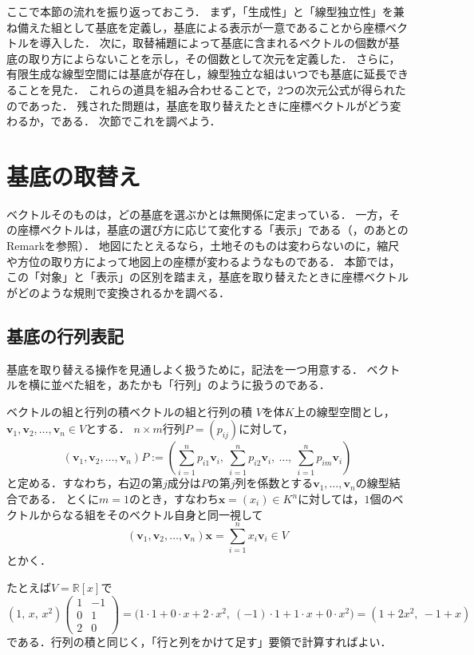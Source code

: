 ここで本節の流れを振り返っておこう．
まず，「生成性」と「線型独立性」を兼ね備えた組として基底を定義し，基底による表示が一意であることから座標ベクトルを導入した．
次に，取替補題によって基底に含まれるベクトルの個数が基底の取り方によらないことを示し，その個数として次元を定義した．
さらに，有限生成な線型空間には基底が存在し，線型独立な組はいつでも基底に延長できることを見た．
これらの道具を組み合わせることで，$2$つの次元公式が得られたのであった．
残された問題は，基底を取り替えたときに座標ベクトルがどう変わるか，である．
次節でこれを調べよう．

\section{基底の取替え}

ベクトルそのものは，どの基底を選ぶかとは無関係に定まっている．
一方，その座標ベクトルは，基底の選び方に応じて変化する「表示」である（，のあとのRemarkを参照）．
地図にたとえるなら，土地そのものは変わらないのに，縮尺や方位の取り方によって地図上の座標が変わるようなものである．
本節では，この「対象」と「表示」の区別を踏まえ，基底を取り替えたときに座標ベクトルがどのような規則で変換されるかを調べる．

\subsection{基底の行列表記}

基底を取り替える操作を見通しよく扱うために，記法を一つ用意する．
ベクトルを横に並べた組を，あたかも「行列」のように扱うのである．

\begin{definition}{ベクトルの組と行列の積}{ベクトルの組と行列の積}
  $V$を体$K$上の線型空間とし，$\bm{v}_1, \bm{v}_2, \dots, \bm{v}_n \in V$とする．
  $n \times m$行列$P = (p_{ij})$に対して，
  \[
    (\bm{v}_1, \bm{v}_2, \dots, \bm{v}_n) P
    :=
    \left( \sum_{i=1}^{n} p_{i1} \bm{v}_i,~ \sum_{i=1}^{n} p_{i2} \bm{v}_i,~ \dots,~ \sum_{i=1}^{n} p_{im} \bm{v}_i \right)
  \]
  と定める．すなわち，右辺の第$j$成分は$P$の第$j$列を係数とする$\bm{v}_1, \dots, \bm{v}_n$の線型結合である．
  とくに$m=1$のとき，すなわち$\bm{x} = (x_i) \in K^n$に対しては，$1$個のベクトルからなる組をそのベクトル自身と同一視して
  \[
    (\bm{v}_1, \bm{v}_2, \dots, \bm{v}_n) \bm{x}
    = \sum_{i=1}^{n} x_i \bm{v}_i \in V
  \]
  とかく．
\end{definition}

たとえば$V=\mathbb{R}[x]$で
\[
  (1,\,x,\,x^2)\begin{pmatrix} 1 & -1 \\ 0 & 1 \\ 2 & 0 \end{pmatrix}
  =\bigl(1\cdot1+0\cdot x+2\cdot x^2,~ (-1)\cdot1+1\cdot x+0\cdot x^2\bigr)
  =(1+2x^2,~ -1+x)
\]
である．行列の積と同じく，「行と列をかけて足す」要領で計算すればよい．

